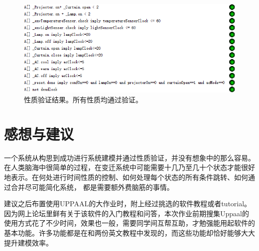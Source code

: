 \documentclass[journal, a4paper]{IEEEtran}
\begin{document}
\begin{figure}[t]
    \centering
    \includegraphics[width=\columnwidth]{images/property.png}
    \caption{性质验证结果。所有性质均通过验证。}
    \label{figure:property}
\end{figure}

\section{感想与建议}
\label{section:suggestion}

一个系统从构思到成功进行系统建模并通过性质验证，并没有想象中的那么容易。在人类脑海中很简单的过程，在变迁系统中可能需要十几乃至几十个状态才能很好地表示。在何处进行时间性质的控制、如何处理每个状态的所有条件跳转、如何通过合并尽可能简化系统， 都是需要额外费脑筋的事情。

建议之后布置使用UPPAAL的大作业时，附上经过挑选的软件教程或者tutorial。因为网上论坛里鲜有关于该软件的入门教程和问答，本次作业前期搜集Uppaal的使用方式花了不少时间，效果也一般，需要同学间互帮互助，才勉强能用起软件的基本功能。许多功能都是在\cite{behrmann2004tutorial}和\cite{david2011uppaal}两份英文教程中发现的，而这些功能却恰好能够大大提升建模效率。




\clearpage
\onecolumn
\end{document}
